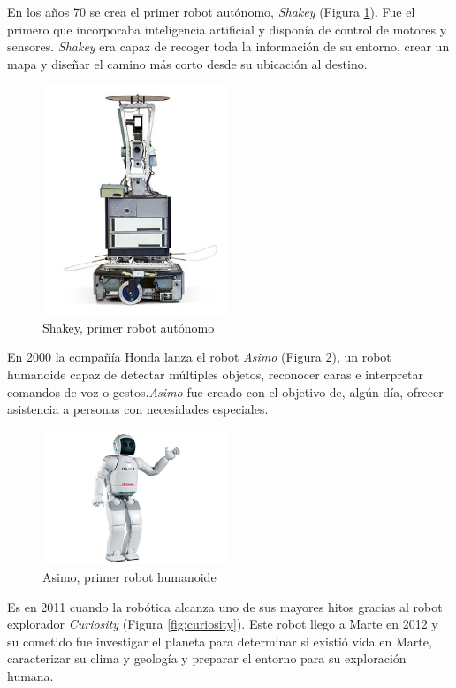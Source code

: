 En los años 70 se crea el primer robot autónomo, \textit{Shakey}  (Figura \ref{fig:shakey}). Fue el primero que incorporaba inteligencia artificial y disponía de control de motores y sensores. \textit{Shakey} era capaz de recoger toda la información de su entorno, crear un mapa y diseñar el camino más corto desde su ubicación al destino. 


\begin{figure}[H]
\centering
\includegraphics[width=0.5\textwidth]{img/shakey.jpg}
\caption{Shakey, primer robot autónomo} \label{fig:shakey}
\end{figure}

En 2000 la compañía Honda lanza el robot \textit{Asimo} (Figura \ref{fig:asimo}), un robot humanoide capaz de detectar múltiples objetos, reconocer caras e interpretar comandos de voz o gestos.\textit{Asimo} fue creado con el objetivo de, algún día, ofrecer asistencia a personas con necesidades especiales. 

\begin{figure}[H]
\centering
\includegraphics[width=0.5\textwidth]{img/asimo-honda.jpg}
\caption{Asimo, primer robot humanoide} \label{fig:asimo}
\end{figure}

Es en 2011 cuando la robótica alcanza uno de sus mayores hitos gracias al robot explorador \textit{Curiosity} (Figura \ref{fig:curiosity}). Este robot llego a Marte en 2012 y su cometido fue investigar el planeta para determinar si existió vida en Marte, caracterizar su clima y geología y preparar el entorno para su exploración humana. 

